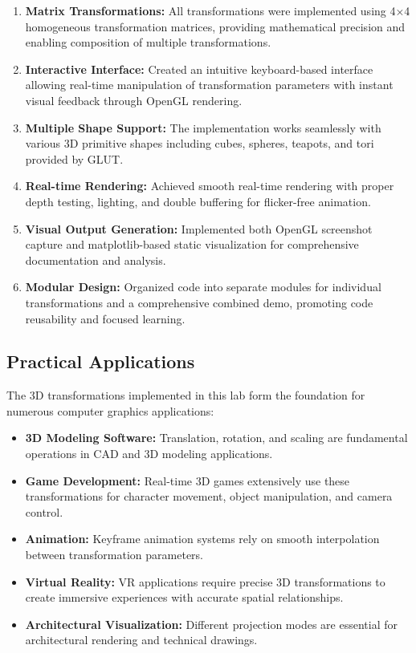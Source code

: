 \documentclass[12pt,a4paper]{article}
\begin{document}
\begin{enumerate}
    \item \textbf{Matrix Transformations:} All transformations were implemented using 4×4 homogeneous transformation matrices, providing mathematical precision and enabling composition of multiple transformations.
    
    \item \textbf{Interactive Interface:} Created an intuitive keyboard-based interface allowing real-time manipulation of transformation parameters with instant visual feedback through OpenGL rendering.
    
    \item \textbf{Multiple Shape Support:} The implementation works seamlessly with various 3D primitive shapes including cubes, spheres, teapots, and tori provided by GLUT.
    
    \item \textbf{Real-time Rendering:} Achieved smooth real-time rendering with proper depth testing, lighting, and double buffering for flicker-free animation.
    
    \item \textbf{Visual Output Generation:} Implemented both OpenGL screenshot capture and matplotlib-based static visualization for comprehensive documentation and analysis.
    
    \item \textbf{Modular Design:} Organized code into separate modules for individual transformations and a comprehensive combined demo, promoting code reusability and focused learning.
\end{enumerate}

\subsection{Practical Applications}

The 3D transformations implemented in this lab form the foundation for numerous computer graphics applications:

\begin{itemize}
    \item \textbf{3D Modeling Software:} Translation, rotation, and scaling are fundamental operations in CAD and 3D modeling applications.
    
    \item \textbf{Game Development:} Real-time 3D games extensively use these transformations for character movement, object manipulation, and camera control.
    
    \item \textbf{Animation:} Keyframe animation systems rely on smooth interpolation between transformation parameters.
    
    \item \textbf{Virtual Reality:} VR applications require precise 3D transformations to create immersive experiences with accurate spatial relationships.
    
    \item \textbf{Architectural Visualization:} Different projection modes are essential for architectural rendering and technical drawings.
\end{itemize}
\end{document}
